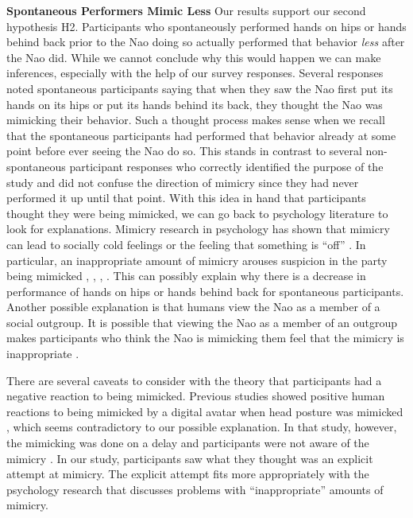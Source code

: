 \documentclass{acm_proc_article-sp}
\begin{document}
\textbf{Spontaneous Performers Mimic Less} Our results support our second hypothesis H2. Participants who spontaneously performed hands on hips or hands behind back prior to the Nao doing so actually performed that behavior \textit{less} after the Nao did. While we cannot conclude why this would happen we can make inferences, especially with the help of our survey responses. Several responses noted spontaneous participants saying that when they saw the Nao first put its hands on its hips or put its hands behind its back, they thought the Nao was mimicking their behavior. Such a thought process makes sense when we recall that the spontaneous participants had performed that behavior already at some point before ever seeing the Nao do so. This stands in contrast to several non-spontaneous participant responses who correctly identified the purpose of the study and did not confuse the direction of mimicry since they had never performed it up until that point. With this idea in hand that participants thought they were being mimicked, we can go back to psychology literature to look for explanations. Mimicry research in psychology has shown that mimicry can lead to socially cold feelings or the feeling that something is ``off'' \cite{gueguen2011mimicry}. In particular, an inappropriate amount of mimicry arouses suspicion in the party being mimicked \cite{bargh2012substitutability}, \cite{leander2012you}, \cite{stel2010mimicking}, \cite{zhong2008cold}. This can possibly explain why there is a decrease in performance of hands on hips or hands behind back for spontaneous participants. Another possible explanation is that humans view the Nao as a member of a social outgroup. It is possible that viewing the Nao as a member of an outgroup makes participants who think the Nao is mimicking them feel that the mimicry is inappropriate \cite{kavanagh2011s}.%

There are several caveats to consider with the theory that participants had a negative reaction to being mimicked. Previous studies showed positive human reactions to being mimicked by a digital avatar when head posture was mimicked \cite{bailenson2005digital}, which seems contradictory to our possible explanation. In that study, however, the mimicking was done on a delay and participants were not aware of the mimicry \cite{bailenson2005digital}. In our study, participants saw what they thought was an explicit attempt at mimicry. The explicit attempt fits more appropriately with the psychology research that discusses problems with ``inappropriate'' amounts of mimicry.
\end{document}
